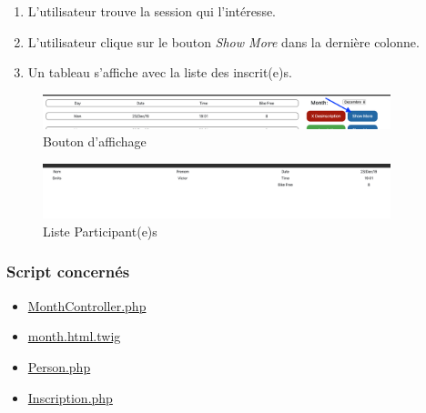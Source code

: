\begin{enumerate}
	\item L'utilisateur trouve la session qui l'intéresse. 
	\item L'utilisateur clique sur le bouton \textit{Show More} dans la dernière colonne. 
	\item Un tableau s'affiche avec la liste des inscrit(e)s. 
\end{enumerate}

\vspace{\baselineskip}
\begin{figure}[h]
	\includegraphics[width=0.9\textwidth,center]{Figures/us6-1}
	\caption{Bouton d'affichage}
\end{figure}

\vspace{\baselineskip}
\begin{figure}[h]
	\includegraphics[width=0.9\textwidth,center]{Figures/us6-2}
	\caption{Liste Participant(e)s}
\end{figure}

\vspace{\baselineskip}
\subsubsection{Script concernés}
	\begin{itemize}
		\item \href{https://github.com/victorsmits/Aquabike/blob/master/backend/src/Controller/MonthController.php}{MonthController.php}
		\item \href{https://github.com/victorsmits/Aquabike/blob/master/backend/templates/registration/month.html.twig}{month.html.twig}
		\item \href{https://github.com/victorsmits/Aquabike/blob/master/backend/src/Entity/Person.php}{Person.php}
		\item \href{https://github.com/victorsmits/Aquabike/blob/master/backend/src/Entity/Inscription.php}{Inscription.php}
	\end{itemize}


